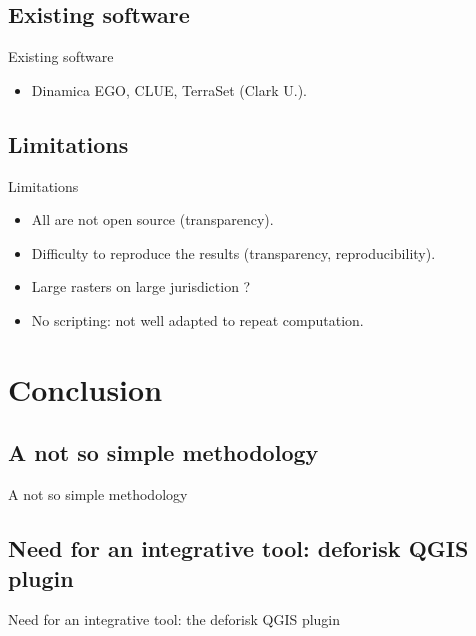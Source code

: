\documentclass[10pt,table,dvipsnames,compress]{beamer}
\begin{document}
\subsection{Existing software}
\label{sec:orgf2891b2}

\begin{frame}[label={sec:orgd98f5de}]{Existing software}
\begin{itemize}
\item Dinamica EGO, CLUE, TerraSet (Clark U.).
\end{itemize}
\end{frame}

\subsection{Limitations}
\label{sec:orga4b34a6}

\begin{frame}[label={sec:org3c47cc4}]{Limitations}
\begin{itemize}
\item All are not open source (transparency).
\item Difficulty to reproduce the results (transparency, reproducibility).
\item Large rasters on large jurisdiction ?
\item No scripting: not well adapted to repeat computation.
\end{itemize}
\end{frame}

\section{Conclusion}
\label{sec:org5e543c5}

\subsection{A not so simple methodology}
\label{sec:org04024c2}

\begin{frame}[label={sec:orgdd2ff0a}]{A not so simple methodology}
\end{frame}

\subsection{Need for an integrative tool: deforisk QGIS plugin}
\label{sec:orgd3a7c15}

\begin{frame}[label={sec:org0508e15}]{Need for an integrative tool: the deforisk QGIS plugin}
\end{frame}
\end{document}
